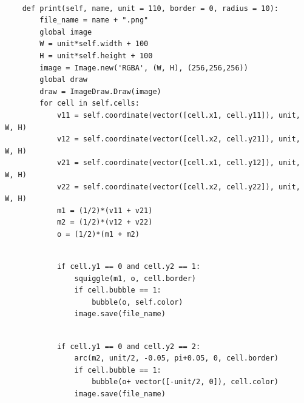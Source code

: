 \documentclass{book}
\newcounter{pcounter}
\begin{document}
\begin{center}
\begin{tcolorbox}[width=5in,colback={white},title={\begin{center}\texttt{Python \thepcounter} \addtocounter{pcounter}{1}  \end{center}},colbacktitle=Red,coltitle=black]
\begin{verbatim}

    def print(self, name, unit = 110, border = 0, radius = 10):
        file_name = name + ".png"
        global image
        W = unit*self.width + 100
        H = unit*self.height + 100
        image = Image.new('RGBA', (W, H), (256,256,256))
        global draw
        draw = ImageDraw.Draw(image)
        for cell in self.cells:
            v11 = self.coordinate(vector([cell.x1, cell.y11]), unit, W, H)
            v12 = self.coordinate(vector([cell.x2, cell.y21]), unit, W, H)
            v21 = self.coordinate(vector([cell.x1, cell.y12]), unit, W, H)
            v22 = self.coordinate(vector([cell.x2, cell.y22]), unit, W, H)
            m1 = (1/2)*(v11 + v21)
            m2 = (1/2)*(v12 + v22)
            o = (1/2)*(m1 + m2)

\end{verbatim}%
\end{tcolorbox}
\end{center}

\begin{center}
\begin{tcolorbox}[width=5in,colback={white},title={\begin{center}\texttt{Python \thepcounter} \addtocounter{pcounter}{1}  \end{center}},colbacktitle=Red,coltitle=black]
\begin{verbatim}

            if cell.y1 == 0 and cell.y2 == 1:
                squiggle(m1, o, cell.border) 
                if cell.bubble == 1:
                    bubble(o, self.color)
                image.save(file_name)

\end{verbatim}%
\end{tcolorbox}
\end{center}

\begin{center}
\begin{tcolorbox}[width=5in,colback={white},title={\begin{center}\texttt{Python \thepcounter} \addtocounter{pcounter}{1}  \end{center}},colbacktitle=Red,coltitle=black]
\begin{verbatim}

            if cell.y1 == 0 and cell.y2 == 2:
                arc(m2, unit/2, -0.05, pi+0.05, 0, cell.border)
                if cell.bubble == 1:
                    bubble(o+ vector([-unit/2, 0]), cell.color)
                image.save(file_name)

\end{verbatim}%
\end{tcolorbox}
\end{center}
\end{document}
